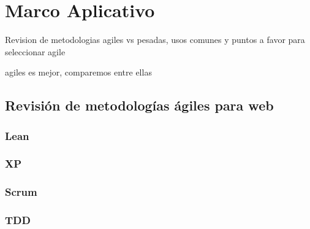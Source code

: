 \section{Marco Aplicativo}

Revision de metodologias agiles vs pesadas, usos comunes y puntos a favor para seleccionar agile

agiles es mejor, comparemos entre ellas
\cite{ComparacionFrameworks}
\subsection{Revisión de metodologías ágiles para web }

    \subsubsection{Lean}
    \subsubsection{XP}
    \subsubsection{Scrum}
    \subsubsection{TDD}